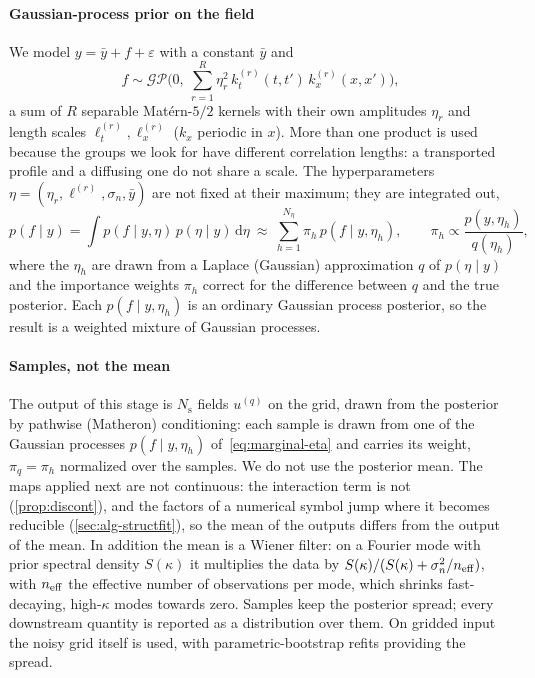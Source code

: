 \documentclass[11pt]{article}
\theoremstyle{plain}
\theoremstyle{definition}
\theoremstyle{remark}
\newcommand{\dd}{\,\mathrm{d}}
\newcommand{\noise}{\sigma_{n}}             %
\newcommand{\Nsamp}{N_{\mathrm s}}          %
\begin{document}
\paragraph{Gaussian-process prior on the field}
We model $y=\bar y+f+\varepsilon$ with a constant $\bar y$ and
\begin{equation}\label{eq:gp}
  f\sim\mathcal{GP}\Big(0,\ \sum_{r=1}^{R}\eta_r^2\,k_t^{(r)}(t,t')\,k_x^{(r)}(x,x')\Big),
\end{equation}
a sum of $R$ separable Mat\'ern-$5/2$ kernels with their own amplitudes $\eta_r$ and length scales
$\ell_t^{(r)},\ell_x^{(r)}$ ($k_x$ periodic in $x$). More than one product is used because the groups we
look for have different correlation lengths: a transported profile and a diffusing one do not share a
scale. The hyperparameters $\eta=(\eta_r,\ell^{(r)},\noise,\bar y)$ are not fixed at their maximum; they are integrated out,
\begin{equation}\label{eq:marginal-eta}
  p(f\mid y)=\int p(f\mid y,\eta)\,p(\eta\mid y)\dd\eta\ \approx\ \sum_{h=1}^{N_\eta}\pi_h\,p(f\mid y,\eta_h),
  \qquad \pi_h\propto\frac{p(y,\eta_h)}{q(\eta_h)},
\end{equation}
where the $\eta_h$ are drawn from a Laplace (Gaussian) approximation $q$ of $p(\eta\mid y)$ and the importance weights
$\pi_h$ correct for the difference between $q$ and the true posterior. Each $p(f\mid y,\eta_h)$ is an ordinary Gaussian
process posterior, so the result is a weighted mixture of Gaussian processes.

\paragraph{Samples, not the mean}
The output of this stage is $\Nsamp$ fields $u^{(q)}$ on the grid, drawn from the posterior by pathwise
(Matheron) conditioning: each sample is drawn from one of the Gaussian processes $p(f\mid y,\eta_h)$
of~\eqref{eq:marginal-eta} and carries its weight, $\pi_q=\pi_h$ normalized over the samples. We do not use the posterior mean. The maps applied next
are not continuous: the interaction term is not (\cref{prop:discont}), and the factors of a numerical symbol jump
where it becomes reducible (\cref{sec:alg-structfit}), so the mean of the outputs differs from the output of the mean. In addition the mean is a Wiener filter: on a Fourier mode with
prior spectral density $S(\kappa)$ it multiplies the data by $S(\kappa)/(S(\kappa)+\noise^2/n_{\rm eff})$, with $n_{\rm eff}$ the effective number of observations per mode,
which shrinks fast-decaying, high-$\kappa$ modes towards zero. Samples keep the posterior spread;
every downstream quantity is reported as a distribution over them. On gridded input the noisy grid
itself is used, with parametric-bootstrap refits providing the spread.
\end{document}
